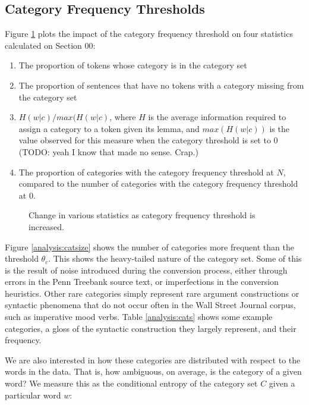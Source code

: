 \subsection{Category Frequency Thresholds}

Figure \ref{analysis:catfreq} plots the impact of the category frequency threshold on four statistics calculated on Section 00:

\begin{enumerate}
 \item The proportion of tokens whose category is in the category set
 \item The proportion of sentences that have no tokens with a category missing from the category set
 \item $H(w|c)/max(H(w|c)$, where $H$ is the average information required to assign a category to a token given its lemma, and $max(H(w|c))$ is the value observed for this measure when the category threshold is set to 0 (TODO: yeah I know that made no sense. Crap.)
 \item The proportion of categories with the category frequency threshold at $N$, compared to the number of categories with the category frequency threshold at 0.
 \end{enumerate}
 
\begin{figure}
\label{analysis:catfreq}\caption{Change in various statistics as category frequency threshold is increased.}
\end{figure}

Figure \ref{analysis:catsize} shows the number of categories more frequent than the threshold $\theta_c$. This shows the heavy-tailed nature of the category set. Some of this is the result of noise introduced during the conversion process, either through errors in the Penn Treebank source text, or imperfections in the conversion heuristics. Other rare categories simply represent rare argument constructions or syntactic phenomena that do not occur often in the Wall Street Journal corpus, such as imperative mood verbs. Table \ref{analysis:cats} shows some example categories, a gloss of the syntactic construction they largely represent, and their frequency.

We are also interested in how these categories are distributed with respect to the words in the data. That is, how ambiguous, on average, is the category of a given word? We measure this as the conditional entropy of the category set $C$ given a particular word $w$:


